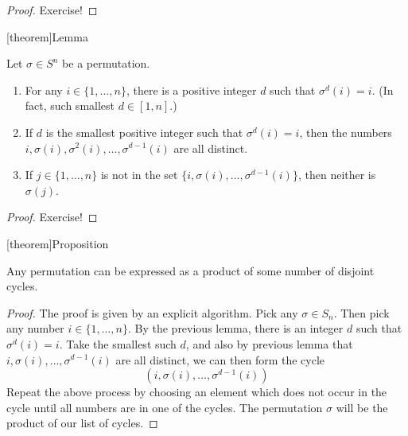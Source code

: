 \documentclass[12pt]{report}
\theoremstyle{definition}
\begin{document}
\begin{proof}
    Exercise!
\end{proof}

[theorem]{Lemma}
\begin{permutation's lemma}
    Let $\sigma \in S^{n}$ be a permutation.
    \begin{enumerate}
        \item For any $i \in \{1, \ldots, n\}$, there is a positive integer $d$
            such that $\sigma^{d}(i) = i$. (In fact, such smallest $d \in [1, n]$.)

        \item If $d$ is the smallest positive integer such that $\sigma^{d}(i) = i$,
            then the numbers $i, \sigma(i), \sigma^{2}(i), \ldots, \sigma^{d-1}(i)$
            are all distinct.

        \item If $j \in \{1, \ldots, n\}$ is not in the set $\{i, \sigma(i), \ldots,
            \sigma^{d-1}(i)\}$, then neither is $\sigma(j)$.
    \end{enumerate}
\end{permutation's lemma}

\begin{proof}
    Exercise!
\end{proof}

[theorem]{Proposition}
\begin{permutation expressed as disjoint cycles}
    Any permutation can be expressed as a product of some number of disjoint cycles.
\end{permutation expressed as disjoint cycles}

\begin{proof}
    The proof is given by an explicit algorithm.
    Pick any $\sigma \in S_n$. Then pick any number $i \in \{1, \ldots, n\}$.
    By the previous lemma, there is an integer $d$ such that $\sigma^{d}(i) = i$.
    Take the smallest such $d$, and also by previous lemma that 
    $i, \sigma(i), \ldots, \sigma^{d-1}(i)$ are all distinct, we can then form the cycle\[
        (i, \sigma(i), \ldots, \sigma^{d-1}(i))
    \]Repeat the above process by choosing an element which does not occur in the cycle
    until all numbers are in one of the cycles.
    The permutation $\sigma$ will be the product of our list of cycles.
\end{proof}
\end{document}
